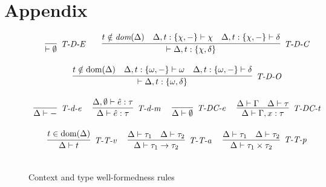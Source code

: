 \documentclass[runningheads]{llncs}
\begin{document}
\section{Appendix}
\begin{figure}[h]
\centering
\[
\begin{array}{c}
\infer[\textit{T-D-E}]
	{\vdash \emptyset}
	{ } 
~~~~~~
\infer[\textit{T-D-C}]
	{\vdash \Delta, t : \{ \chi, \delta \}}
	{t \notin \textit{dom}(\Delta) & \Delta, t : \{ \chi, - \} \vdash \chi & \Delta, t : \{ \chi, - \} \vdash \delta}\\[3ex]
	
\infer[\textit{T-D-O}]
	{\vdash \Delta, t : \{ \omega, \delta \}}
	{t \notin \text{dom}(\Delta) & \Delta, t : \{ \omega, - \} \vdash \omega & \Delta, t : \{ \omega, - \} \vdash \delta} \\[3ex]

\infer[\textit{T-d-e}]
	{\Delta \vdash -}
	{ }
~~~~
\infer[\textit{T-d-m}]
	{\Delta \vdash \hat{e} : \tau}
	{\Delta, \emptyset \vdash \hat{e} : \tau}
~~~~
\infer[\textit{T-DC-e}]
	{\Delta \vdash \emptyset}
	{ }
~~~~
\infer[\textit{T-DC-t}]
	{\Delta \vdash \Gamma, x : \tau}
	{\Delta \vdash \Gamma & \Delta \vdash \tau}
\\[3ex]
\infer[\textit{T-T-v}]
	{\Delta \vdash t}
	{t \in \text{dom}(\Delta)}
~~~~
\infer[\textit{T-T-a}]
	{\Delta \vdash \tau_1 \rightarrow \tau_2}
	{\Delta \vdash \tau_1 & \Delta \vdash \tau_2}
~~~~
\infer[\textit{T-T-p}]
	{\Delta \vdash \tau_1 \times \tau_2}
	{\Delta \vdash \tau_1 & \Delta \vdash \tau_2}\\[3ex]
\end{array}
\]
\vspace{-15px}
\caption{Context and type well-formedness rules}
\vspace{-12px}
\end{figure}
\end{document}
